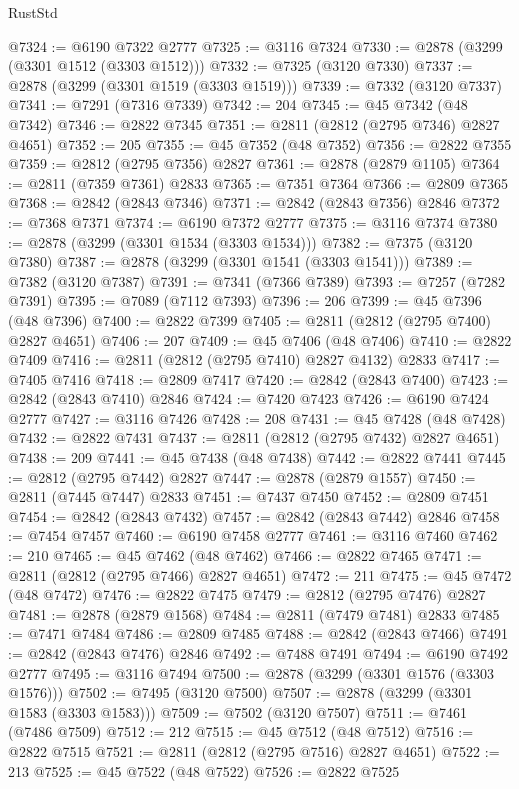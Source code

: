 \begin{lexlean}{RustStd}
\begin{coremodule}
@7324 := @6190 @7322 @2777
@7325 := @3116 @7324
@7330 := @2878 (@3299 (@3301 @1512 (@3303 @1512)))
@7332 := @7325 (@3120 @7330)
@7337 := @2878 (@3299 (@3301 @1519 (@3303 @1519)))
@7339 := @7332 (@3120 @7337)
@7341 := @7291 (@7316 @7339)
@7342 := 204
@7345 := @45 @7342 (@48 @7342)
@7346 := @2822 @7345
@7351 := @2811 (@2812 (@2795 @7346) @2827 @4651)
@7352 := 205
@7355 := @45 @7352 (@48 @7352)
@7356 := @2822 @7355
@7359 := @2812 (@2795 @7356) @2827
@7361 := @2878 (@2879 @1105)
@7364 := @2811 (@7359 @7361) @2833
@7365 := @7351 @7364
@7366 := @2809 @7365
@7368 := @2842 (@2843 @7346)
@7371 := @2842 (@2843 @7356) @2846
@7372 := @7368 @7371
@7374 := @6190 @7372 @2777
@7375 := @3116 @7374
@7380 := @2878 (@3299 (@3301 @1534 (@3303 @1534)))
@7382 := @7375 (@3120 @7380)
@7387 := @2878 (@3299 (@3301 @1541 (@3303 @1541)))
@7389 := @7382 (@3120 @7387)
@7391 := @7341 (@7366 @7389)
@7393 := @7257 (@7282 @7391)
@7395 := @7089 (@7112 @7393)
@7396 := 206
@7399 := @45 @7396 (@48 @7396)
@7400 := @2822 @7399
@7405 := @2811 (@2812 (@2795 @7400) @2827 @4651)
@7406 := 207
@7409 := @45 @7406 (@48 @7406)
@7410 := @2822 @7409
@7416 := @2811 (@2812 (@2795 @7410) @2827 @4132) @2833
@7417 := @7405 @7416
@7418 := @2809 @7417
@7420 := @2842 (@2843 @7400)
@7423 := @2842 (@2843 @7410) @2846
@7424 := @7420 @7423
@7426 := @6190 @7424 @2777
@7427 := @3116 @7426
@7428 := 208
@7431 := @45 @7428 (@48 @7428)
@7432 := @2822 @7431
@7437 := @2811 (@2812 (@2795 @7432) @2827 @4651)
@7438 := 209
@7441 := @45 @7438 (@48 @7438)
@7442 := @2822 @7441
@7445 := @2812 (@2795 @7442) @2827
@7447 := @2878 (@2879 @1557)
@7450 := @2811 (@7445 @7447) @2833
@7451 := @7437 @7450
@7452 := @2809 @7451
@7454 := @2842 (@2843 @7432)
@7457 := @2842 (@2843 @7442) @2846
@7458 := @7454 @7457
@7460 := @6190 @7458 @2777
@7461 := @3116 @7460
@7462 := 210
@7465 := @45 @7462 (@48 @7462)
@7466 := @2822 @7465
@7471 := @2811 (@2812 (@2795 @7466) @2827 @4651)
@7472 := 211
@7475 := @45 @7472 (@48 @7472)
@7476 := @2822 @7475
@7479 := @2812 (@2795 @7476) @2827
@7481 := @2878 (@2879 @1568)
@7484 := @2811 (@7479 @7481) @2833
@7485 := @7471 @7484
@7486 := @2809 @7485
@7488 := @2842 (@2843 @7466)
@7491 := @2842 (@2843 @7476) @2846
@7492 := @7488 @7491
@7494 := @6190 @7492 @2777
@7495 := @3116 @7494
@7500 := @2878 (@3299 (@3301 @1576 (@3303 @1576)))
@7502 := @7495 (@3120 @7500)
@7507 := @2878 (@3299 (@3301 @1583 (@3303 @1583)))
@7509 := @7502 (@3120 @7507)
@7511 := @7461 (@7486 @7509)
@7512 := 212
@7515 := @45 @7512 (@48 @7512)
@7516 := @2822 @7515
@7521 := @2811 (@2812 (@2795 @7516) @2827 @4651)
@7522 := 213
@7525 := @45 @7522 (@48 @7522)
@7526 := @2822 @7525

\end{coremodule}
\end{lexlean}
